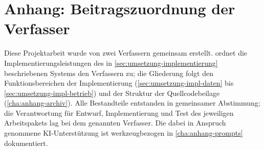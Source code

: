 %

\chapter{Anhang: Beitragszuordnung der Verfasser}
\label{cha:anhang-beitraege}

Diese Projektarbeit wurde von zwei Verfassern gemeinsam erstellt.
 ordnet die Implementierungsleistungen des in
\cref{sec:umsetzung-implementierung} beschriebenen Systems den Verfassern zu;
die Gliederung folgt den Funktionsbereichen der Implementierung
(\cref{sec:umsetzung-impl-daten} bis \cref{sec:umsetzung-impl-betrieb}) und der
Struktur der Quellcodebeilage (\cref{cha:anhang-archiv}). Alle Bestandteile
entstanden in gemeinsamer Abstimmung; die Verantwortung für Entwurf,
Implementierung und Test des jeweiligen Arbeitspakets lag bei dem genannten
Verfasser. Die dabei in Anspruch genommene KI-Unterstützung ist werkzeugbezogen
in \cref{cha:anhang-prompts} dokumentiert.

